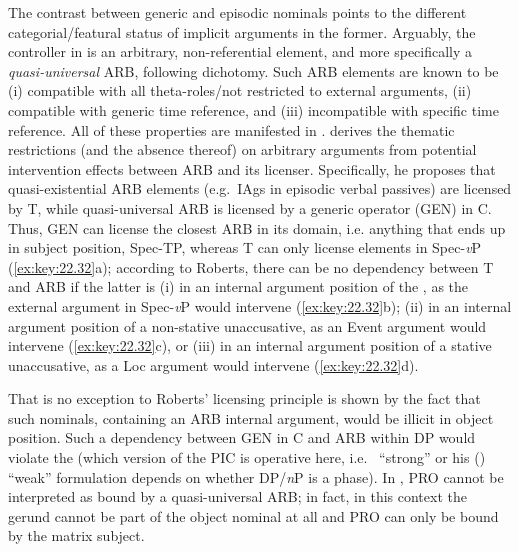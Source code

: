 \documentclass[output=paper]{langsci/langscibook}
\begin{document}
The contrast between generic and episodic nominals points to the different
categorial/featural status of implicit arguments in the former. Arguably, the
controller in  is an arbitrary, non-referential element, and
more specifically a \emph{quasi-universal} ARB, following 
dichotomy. Such ARB elements are known to be (i) compatible with all
theta-roles/not restricted to external arguments, (ii) compatible with generic
time reference, and (iii) incompatible with specific time reference. All of
these properties are manifested in . \citet{Roberts2014b}
derives the thematic restrictions (and the absence thereof) on arbitrary
arguments from potential intervention effects between ARB and its licenser.
Specifically, he proposes that quasi-existential ARB elements (e.g.\ \glspl{IAg} in
episodic verbal passives) are licensed by T, while quasi-universal ARB is
licensed by a generic operator (GEN) in C. Thus, GEN can license the closest
ARB in its domain, i.e.  anything that ends up in subject position, Spec-TP,
whereas T can only license elements in Spec-\emph{v}P (\ref{ex:key:22.32}a);
according to Roberts, there can be no dependency between T and ARB if the
latter is (i) in an internal argument position of the , as the external
argument in Spec-\emph{v}P would intervene (\ref{ex:key:22.32}b); (ii) in an
internal argument position of a non-stative unaccusative, as an Event argument
would intervene (\ref{ex:key:22.32}c), or (iii) in an internal argument position of
a stative unaccusative, as a Loc argument would intervene (\ref{ex:key:22.32}d).

\ea%
    \label{ex:key:22.32} \textcite[5]{Roberts2014b}
    \ea[]{T\tss{i} [\tss{\emph{v}P}  arb\tss{i}  [VP \dots}
    \ex[*]{T\tss{i} [\tss{\emph{v}P} \gls{EA} [\tss{VP} \dots{} arb\tss{i} \dots{}}
    \ex[*]{T\tss{i} \dots{} Ev \dots{} [\tss{VP} \dots{} arb\tss{i} \dots{}}
    \ex[*]{T\tss{i} \dots{} Loc \dots{}  [\tss{VP} \dots{} arb\tss{i} \dots{}}
    \z
\z

That  is no exception to Roberts’ licensing principle is
shown by the fact that such nominals, containing an ARB internal argument,
would be illicit in object position. Such a dependency between GEN in C and ARB
within DP would violate the  (which version of
the \gls{PIC} is operative here, i.e.\  \enquote{strong} or his
(\citeyear{Chomsky2001}) \enquote{weak} formulation depends on whether
DP/\emph{n}P is a phase). In , PRO cannot be interpreted as
bound by a quasi-universal ARB; in fact, in this context the gerund cannot be
part of the object nominal at all and PRO can only be bound by the matrix
subject.
\end{document}
